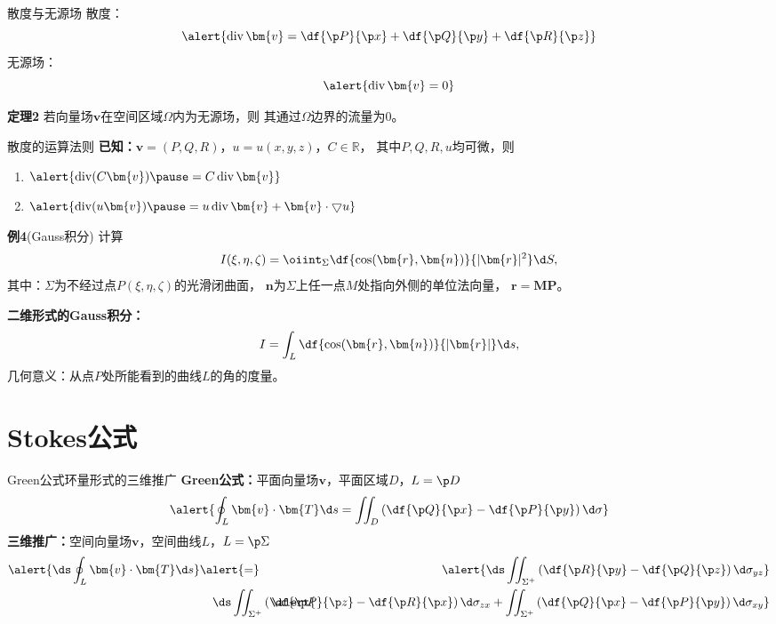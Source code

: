 \begin{frame}{散度与无源场}
	\linespread{1.2}\pause 
	{\bb 散度：}
	$$\alert{\mathrm{div}\,\bm{v}=\df{\p P}{\p x}+\df{\p Q}{\p y}+\df{\p R}{\p
	z}}$$\pause 
	{\bb 无源场：}
	$$\alert{\mathrm{div}\,\bm{v}=0}$$\pause 
	\begin{block}{{\bf 定理2}\hfill}
		若向量场$\bm{v}$在空间区域$\Omega$内为无源场，则
		其通过$\Omega$边界的流量为$0$。
	\end{block}
\end{frame}

\begin{frame}{散度的运算法则}
	\linespread{1.5}\pause 
	{\bf 已知：}$\bm{v}=(P,Q,R)$，$u=u(x,y,z)$，$C\in\mathbb{R}$，\pause 
	其中$P,Q,R,u$均可微，则\pause 
	\begin{enumerate}
	  \item $\alert{\mathrm{div}(C\bm{v})\pause =C\,\mathrm{div}\,\bm{v}}$\pause 
	  \item $\alert{\mathrm{div}(u\bm{v})\pause =u\,\mathrm{div}\,\bm{v}
	  +\bm{v}\cdot\bigtriangledown u}$
	\end{enumerate}
\end{frame}

\begin{frame}
	\linespread{1.2}
	\begin{alertblock}{{\bf 例4}(Gauss积分)\hfill}
		计算
		$$I(\xi,\eta,\zeta)=\oiint_{\Sigma}
		\df{\cos(\bm{r},\bm{n})}{|\bm{r}|^2}\d S,$$
		其中：$\Sigma$为不经过点$P(\xi,\eta,\zeta)$的光滑闭曲面，
		$\bm{n}$为$\Sigma$上任一点$M$处指向外侧的单位法向量，
		$\bm{r}=\bm{MP}$。
	\end{alertblock}\pause
	{\bf 二维形式的Gauss积分：}
	$$I=\int_L\df{\cos(\bm{r},\bm{n})}{|\bm{r}|}\d s,$$\pause
	几何意义：从点$P$处所能看到的曲线$L$的角的度量。
\end{frame}

\section{Stokes公式}

\begin{frame}{Green公式环量形式的三维推广}
	\linespread{1.2}
	{\bf Green公式：}平面向量场$\bm{v}$，平面区域$D$，$L=\p D$\pause 
	$$\alert{\oint_L\bm{v}\cdot\bm{T}\d s=\iint_D
	\left(\df{\p Q}{\p x}-\df{\p P}{\p y}\right)\d\sigma}$$
	\pause 
	{\bf 三维推广：}\pause 空间向量场$\bm{v}$，\pause 空间曲线$L$，\pause $L=\p\Sigma$\pause 
	\begin{eqnarray*}
		\alert{\ds\oint_L\bm{v}\cdot\bm{T}\d s}&\alert{=}&
		\alert{\ds\iint_{\Sigma^+}\left(\df{\p R}{\p y}-\df{\p Q}{\p
		z}\right)\d\sigma_{yz}}\\ 
		&& \alert{\hspace{-3cm}\ds\iint_{\Sigma^+}\left(\df{\p P}{\p
		z}-\df{\p R}{\p x}\right)\d\sigma_{zx}
		+\iint_{\Sigma^+}\left(\df{\p Q}{\p x}-\df{\p P}{\p y}\right)\d\sigma_{xy}}
	\end{eqnarray*}
\end{frame}

